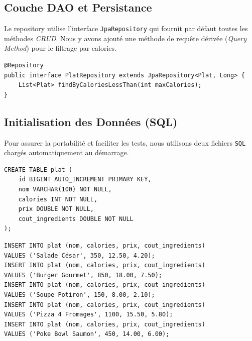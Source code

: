 \documentclass[12pt,a4paper,french]{article}
\begin{document}
\subsection{Couche DAO et Persistance}
Le repository utilise l'interface \texttt{JpaRepository} qui fournit par défaut toutes les méthodes
\textit{CRUD}. Nous y avons ajouté une méthode de requête dérivée (\textit{Query Method}) pour le filtrage par calories.

\begin{tcolorbox}[projectbox, title=PlatRepository.java]
    \begin{verbatim}
@Repository
public interface PlatRepository extends JpaRepository<Plat, Long> {
    List<Plat> findByCaloriesLessThan(int maxCalories);
}
\end{verbatim}
\end{tcolorbox}

\subsection{Initialisation des Données (SQL)}
Pour assurer la portabilité et faciliter les tests, nous utilisons deux fichiers \texttt{SQL} chargés
automatiquement au démarrage.

\begin{tcolorbox}[projectbox, title=schema.sql]
    \begin{verbatim}
CREATE TABLE plat (
    id BIGINT AUTO_INCREMENT PRIMARY KEY,
    nom VARCHAR(100) NOT NULL,
    calories INT NOT NULL,
    prix DOUBLE NOT NULL,
    cout_ingredients DOUBLE NOT NULL
);
\end{verbatim}
\end{tcolorbox}

\begin{tcolorbox}[projectbox, title=data.sql]
    \begin{verbatim}
INSERT INTO plat (nom, calories, prix, cout_ingredients) 
VALUES ('Salade César', 350, 12.50, 4.20);
INSERT INTO plat (nom, calories, prix, cout_ingredients) 
VALUES ('Burger Gourmet', 850, 18.00, 7.50);
INSERT INTO plat (nom, calories, prix, cout_ingredients) 
VALUES ('Soupe Potiron', 150, 8.00, 2.10);
INSERT INTO plat (nom, calories, prix, cout_ingredients) 
VALUES ('Pizza 4 Fromages', 1100, 15.50, 5.80);
INSERT INTO plat (nom, calories, prix, cout_ingredients) 
VALUES ('Poke Bowl Saumon', 450, 14.00, 6.00);
\end{verbatim}
\end{tcolorbox}
\end{document}

